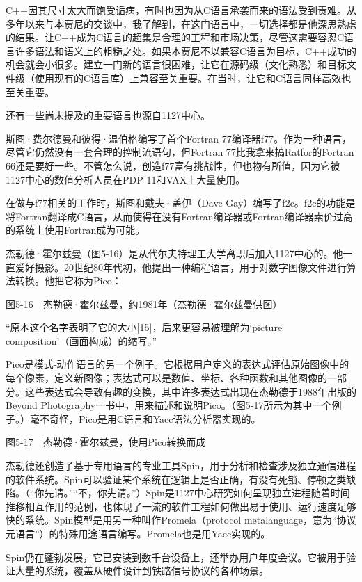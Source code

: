 \documentclass[a4paper,12pt,UTF8,twoside]{ctexbook}
\begin{document}
C++因其尺寸太大而饱受诟病，有时也因为从C语言承袭而来的语法受到责难。从多年以来与本贾尼的交谈中，我了解到，在这门语言中，一切选择都是他深思熟虑的结果。让C++成为C语言的超集是合理的工程和市场决策，尽管这需要容忍C语言许多语法和语义上的粗糙之处。如果本贾尼不以兼容C语言为目标，C++成功的机会就会小很多。建立一门新的语言很困难，让它在源码级（文化熟悉）和目标文件级（使用现有的C语言库）上兼容至关重要。在当时，让它和C语言同样高效也至关重要。

还有一些尚未提及的重要语言也源自1127中心。

斯图·费尔德曼和彼得·温伯格编写了首个Fortran 77编译器f77。作为一种语言，尽管它仍然没有一套合理的控制流语句，但Fortran 77比我拿来搞Ratfor的Fortran 66还是要好一些。不管怎么说，创造f77富有挑战性，但也物有所值，因为它被1127中心的数值分析人员在PDP-11和VAX上大量使用。

在做与f77相关的工作时，斯图和戴夫·盖伊（Dave Gay）编写了f2c。f2c的功能是将Fortran翻译成C语言，从而使得在没有Fortran编译器或Fortran编译器索价过高的系统上使用Fortran成为可能。

杰勒德·霍尔兹曼（图5-16）是从代尔夫特理工大学离职后加入1127中心的。他一直爱好摄影。20世纪80年代初，他提出一种编程语言，用于对数字图像文件进行算法转换。他把它称为Pico：



图5-16　杰勒德·霍尔兹曼，约1981年（杰勒德·霍尔兹曼供图）

“原本这个名字表明了它的大小[15]，后来更容易被理解为‘picture composition’（画面构成）的缩写。”



Pico是模式-动作语言的另一个例子。它根据用户定义的表达式评估原始图像中的每个像素，定义新图像；表达式可以是数值、坐标、各种函数和其他图像的一部分。这些表达式会导致有趣的变换，其中许多表达式出现在杰勒德于1988年出版的Beyond Photography一书中，用来描述和说明Pico。（图5-17所示为其中一个例子。）毫不奇怪，Pico是用C语言和Yacc语法分析器实现的。



图5-17　杰勒德·霍尔兹曼，使用Pico转换而成

杰勒德还创造了基于专用语言的专业工具Spin，用于分析和检查涉及独立通信进程的软件系统。Spin可以验证某个系统在逻辑上是否正确，有没有死锁、停顿之类缺陷。（“你先请。”“不，你先请。”）Spin是1127中心研究如何呈现独立进程随着时间推移相互作用的范例，也体现了一流的软件工程如何做出易于使用、运行速度足够快的系统。Spin模型是用另一种叫作Promela（protocol metalanguage，意为“协议元语言”）的特殊用途语言编写。Promela也是用Yacc实现的。

Spin仍在蓬勃发展，它已安装到数千台设备上，还举办用户年度会议。它被用于验证大量的系统，覆盖从硬件设计到铁路信号协议的各种场景。
\end{document}
